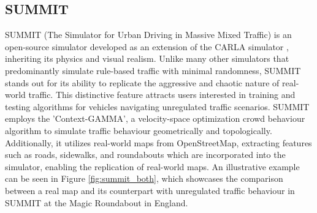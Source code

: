 \documentclass[12pt,twoside,a4paper,parskip]{scrbook} %
\begin{document}
\subsection{SUMMIT}
SUMMIT (The Simulator for Urban Driving in Massive Mixed Traffic) is an open-source simulator developed as an extension of the CARLA simulator \cite{Carla}, inheriting its physics and visual realism. Unlike many other simulators that predominantly simulate rule-based traffic with minimal randomness, SUMMIT stands out for its ability to replicate the aggressive and chaotic nature of real-world traffic. This distinctive feature attracts users interested in training and testing algorithms for vehicles navigating unregulated traffic scenarios. SUMMIT employs the 'Context-GAMMA', a velocity-space optimization crowd behaviour algorithm \cite{SUMMIT} to simulate traffic behaviour geometrically and topologically. Additionally, it utilizes real-world maps from OpenStreetMap, extracting features such as roads, sidewalks, and roundabouts which are incorporated into the simulator, enabling the replication of real-world maps. An illustrative example can be seen in Figure \ref{fig:summit_both}, which showcases the comparison between a real map and its counterpart with unregulated traffic behaviour in SUMMIT at the Magic Roundabout in England. 
\end{document}
